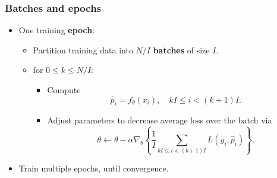 \documentclass{beamer}
\begin{document}
    \begin{frame}
        \frametitle{Batches and epochs}

        \bigskip
        \begin{itemize}
            \setlength\itemsep{1em}
            \item One training \textbf{epoch}:
            
            \bigskip
            \begin{itemize}
            \setlength\itemsep{1em}
            \item Partition training data into $N/I$ \textbf{batches} of size $I$.

            \item for $0\leq k \leq N/I$:
            
            \bigskip
            \begin{itemize}
                \setlength\itemsep{1em}
                \item Compute
                \[
                    \widehat{p}_i = f_\theta(x_i),\quad kI\leq i<(k+1)I.
                \]

                \item Adjust parameters to decrease average loss over the batch via
            \[
                \theta\leftarrow \theta - \alpha\nabla_\theta\left\{\frac1I\sum_{bI\leq i < (b+1)I} L(y_i,\widehat{p}_i)\right\}.
            \]
            \end{itemize}
        \end{itemize}            
            \item Train multiple epochs, until convergence.



        \end{itemize}
    
        
    
    \end{frame}
    
\end{document}
